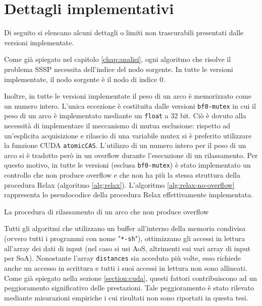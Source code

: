 \documentclass[12pt,a4paper,oneside]{book}
\begin{document}
	\section{Dettagli implementativi}
	\label{section:impl}
	Di seguito si elencano alcuni dettagli o limiti non trascurabili presentati dalle versioni implementate.
	
	Come già spiegato nel capitolo \ref{chap:analisi}, ogni algoritmo che risolve il problema SSSP necessita dell'indice del nodo sorgente. In tutte le versioni implementate, il nodo sorgente è il nodo di indice $0$.
	
	Inoltre, in tutte le versioni implementate il peso di un arco è memorizzato come un numero intero. L'unica eccezione è costituita dalle versioni \texttt{bf0-mutex} in cui il peso di un arco è implementato mediante un \texttt{float} a 32 bit. Ciò è dovuto alla necessità di implementare il meccanismo di mutua esclusione: rispetto ad un'esplicita acquisizione e rilascio di una variabile mutex si è preferito utilizzare la funzione CUDA \texttt{atomicCAS}. L'utilizzo di un numero intero per il peso di un arco si è tradotto però in un overflow durante l'esecuzione di un rilassamento. Per questo motivo, in tutte le versioni (esclusa \texttt{bf0-mutex}) è stato implementato un controllo che non produce overflow e che non ha più la stessa struttura della procedura Relax (algoritmo \ref{alg:relax}). L'algoritmo \ref{alg:relax-no-overflow} rappresenta lo pseudocodice della procedura Relax effettivamente implementata.
	
	\begin{algorithm}
		\caption{La procedura di rilassamento di un arco che non produce overflow}
		\label{alg:relax-no-overflow}
	\end{algorithm}

	Tutti gli algoritmi che utilizzano un buffer all'interno della memoria condivisa (ovvero tutti i programmi con nome "\texttt{*-sh}"), ottimizzano gli accessi in lettura all'array dei dati di input (nel caso si usi AoS, altrimenti sui vari array di input per SoA). Nonostante l'array \texttt{distances} sia acceduto più volte, esso richiede anche un accesso in scrittura e tutti i suoi accessi in lettura non sono allineati. Come già spiegato nella sezione \ref{section:cuda}, questi fattori contribuiscono ad un peggioramento significativo delle prestazioni. Tale peggioramento è stato rilevato mediante misurazioni empiriche i cui risultati non sono riportati in questa tesi.
	
\end{document}
